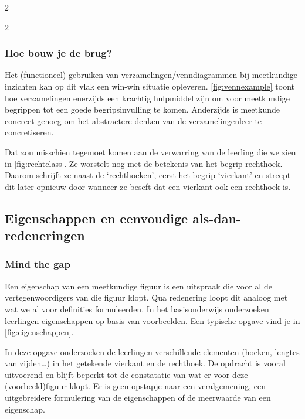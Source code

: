 
\begin{multicols}{2}
    


\end{multicols}


\begin{multicols}{2}
    

\subsubsection*{Hoe bouw je de brug?}

Het (functioneel) gebruiken van verzamelingen/venndiagrammen bij meetkundige inzichten kan op dit vlak een win-win situatie opleveren.
\autoref{fig:vennexample} toont hoe verzamelingen enerzijds een krachtig hulpmiddel zijn om voor meetkundige begrippen tot een goede begripsinvulling te komen.
Anderzijds is meetkunde concreet genoeg om het abstractere denken van de verzamelingenleer te concretiseren.


Dat zou misschien tegemoet komen aan de verwarring van de leerling die we zien in \autoref{fig:rechtclass}.
Ze worstelt nog met de betekenis van het begrip rechthoek.
Daarom schrijft ze naast de `rechthoeken', eerst het begrip `vierkant' en streept dit later opnieuw door wanneer ze beseft dat een vierkant ook een rechthoek is.



\subsection{Eigenschappen en eenvoudige als-dan-redeneringen}\label{eigenschappen-en-eenvoudige-als-dan-redeneringen}

\subsubsection*{Mind the gap}

Een eigenschap van een meetkundige figuur is een uitspraak die voor al de vertegenwoordigers van die figuur klopt.
Qua redenering loopt dit analoog met wat we al voor definities formuleerden.
In het basisonderwijs onderzoeken leerlingen eigenschappen op basis van voorbeelden.
Een typische opgave vind je in \autoref{fig:eigenschappen}.


In deze opgave onderzoeken de leerlingen verschillende elementen (hoeken, lengtes van zijden\ldots) in het getekende vierkant en de rechthoek.
De opdracht is vooral uitvoerend en blijft beperkt tot de constatatie van wat er voor deze (voorbeeld)figuur klopt.
Er is geen opstapje naar een veralgemening, een uitgebreidere formulering van de eigenschappen of de meerwaarde van een eigenschap.


\end{multicols}

